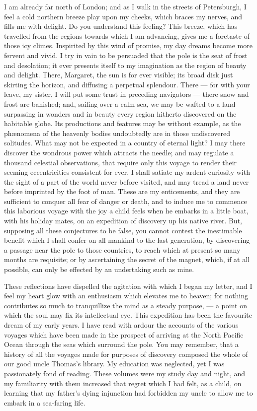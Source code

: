 I am already far north of London;
and as I walk in the streets of Petersburgh,
I feel a cold northern breeze
play upon my cheeks, which braces my
nerves, and fills me with delight. Do
you understand this feeling? This
breeze, which has travelled from the
regions towards which I am advancing,
gives me a foretaste of those icy climes.
Inspirited by this wind of promise, my
day dreams become more fervent and
vivid. I try in vain to be persuaded
that the pole is the seat of frost and desolation;
it ever presents itself to my
imagination as the region of beauty
and delight. There, Margaret, the
sun is for ever visible; its broad disk
just skirting the horizon, and diffusing
a perpetual splendour. There --- for
with your leave, my sister, I will put
some trust in preceding navigators --- there
snow and frost are banished; and,
sailing over a calm sea, we may be
wafted to a land surpassing in wonders
and in beauty every region hitherto discovered
on the habitable globe. Its
productions and features may be without
example, as the phænomena of the
heavenly bodies undoubtedly are in
those undiscovered solitudes. What
may not be expected in a country of
eternal light? I may there discover
the wondrous power which attracts the
needle; and may regulate a thousand
celestial observations, that require only
this voyage to render their seeming
eccentricities consistent for ever. I
shall satiate my ardent curiosity with
the sight of a part of the world never
before visited, and may tread a land
never before imprinted by the foot of
man. These are my enticements, and
they are sufficient to conquer all fear of
danger or death, and to induce me to
commence this laborious voyage with
the joy a child feels when he embarks
in a little boat, with his holiday mates,
on an expedition of discovery up his
native river. But, supposing all these
conjectures to be false, you cannot contest
the inestimable benefit which I shall
confer on all mankind to the last generation,
by discovering a passage near
the pole to those countries, to reach
which at present so many months are
requisite; or by ascertaining the secret
of the magnet, which, if at all possible,
can only be effected by an undertaking
such as mine.

These reflections have dispelled the
agitation with which I began my letter,
and I feel my heart glow with an enthusiasm
which elevates me to heaven;
for nothing contributes so much to
tranquillize the mind as a steady purpose, --- a
point on which the soul may fix
its intellectual eye. This expedition
has been the favourite dream of my
early years. I have read with ardour
the accounts of the various voyages
which have been made in the prospect
of arriving at the North Pacific Ocean
through the seas which surround the
pole. You may remember, that a
history of all the voyages made for
purposes of discovery composed the
whole of our good uncle Thomas's library.
My education was neglected,
yet I was passionately fond of reading.
These volumes were my study
day and night, and my familiarity
with them increased that regret which
I had felt, as a child, on learning that
my father's dying injunction had forbidden
my uncle to allow me to embark
in a sea-faring life.

